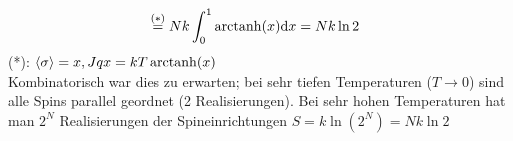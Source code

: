 \begin{enumerate}[A)]
\begin{enumerate}[i)]
\begin{equation}
\begin{split}
                & \overset{(*)}{=} N k \int_0^1 \operatorname{arctanh} (x) \mathrm{d} x = N k \ln 2
            \end{split}
        \end{equation}
        (*): $\left\langle\sigma\right\rangle=x, J q x = k T \operatorname{arctanh}(x)$ \\
        Kombinatorisch war dies zu erwarten; bei sehr tiefen Temperaturen ($T \to 0$) sind alle Spins parallel geordnet (2 Realisierungen). 
        Bei sehr hohen Temperaturen hat man $2^N$ Realisierungen der Spineinrichtungen $S = k \ln \left( 2^N \right)  = N k \ln 2$
    \end{enumerate}
\end{enumerate}
